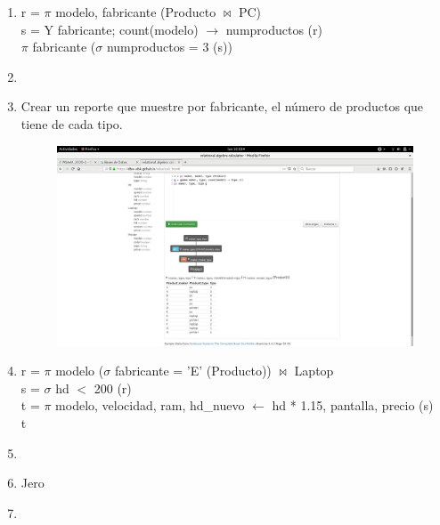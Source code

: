 \documentclass[a4paper, 12pt]{report}
\begin{document}
{\begin{enumerate}[label=\alph*)]
{\begin{figure}[hb!]
            {img/k.png}\hfill
    \end{figure}
}
\item{r = $\pi$ modelo, fabricante (Producto $\Join$ PC)\\
s = Y fabricante; count(modelo) $\rightarrow$ numproductos (r)\\
$\pi$ fabricante ($\sigma$ numproductos = 3 (s))}
\item{}
\item{Crear un reporte que muestre por fabricante, el número de productos que tiene de cada tipo.\\
    \begin{figure}[hb!]
        \includegraphics[width=\textwidth]
            {img/n.png}\hfill
    \end{figure}
}
\item{r = $\pi$ modelo ($\sigma$ fabricante = 'E' (Producto)) $\Join$ Laptop\\
s = $\sigma$ hd $<$ 200 (r)\\
t = $\pi$ modelo, velocidad, ram, hd\_nuevo $\leftarrow$ hd * 1.15, pantalla, precio (s)\\
t}
\item{}
\item{Jero}
\item{}
\end{enumerate}
}
\end{document}

